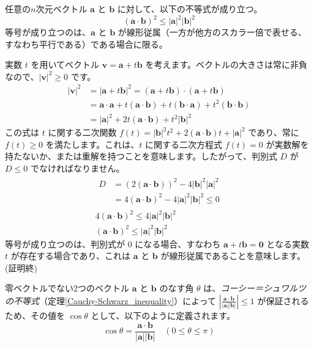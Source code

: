 \begin{thm} \label{Cauchy-Schwarz_inequality}
任意の$n$次元ベクトル $\bm{a}$ と $\bm{b}$ に対して、以下の不等式が成り立つ。
\[(\bm{a} \cdot \bm{b})^2 \le |\bm{a}|^2 |\bm{b}|^2\]
等号が成り立つのは、$\bm{a}$ と $\bm{b}$ が線形従属（一方が他方のスカラー倍で表せる、すなわち平行である）である場合に限る。
\begin{proof*}
実数 $t$ を用いてベクトル $\bm{v} = \bm{a} + t\bm{b}$ を考えます。ベクトルの大きさは常に非負なので、$|\bm{v}|^2 \ge 0$ です。
\begin{align*}
|\bm{v}|^2 &= |\bm{a} + t\bm{b}|^2 = (\bm{a} + t\bm{b}) \cdot (\bm{a} + t\bm{b})\\
&= \bm{a} \cdot \bm{a} + t(\bm{a} \cdot \bm{b}) + t(\bm{b} \cdot \bm{a}) + t^2(\bm{b} \cdot \bm{b})\\
&= |\bm{a}|^2 + 2t(\bm{a} \cdot \bm{b}) + t^2|\bm{b}|^2
\end{align*}
この式は $t$ に関する二次関数 $f(t) = |\bm{b}|^2 t^2 + 2(\bm{a} \cdot \bm{b}) t + |\bm{a}|^2$ であり、常に $f(t) \ge 0$ を満たします。これは、$t$ に関する二次方程式 $f(t) = 0$ が実数解を持たないか、または重解を持つことを意味します。したがって、判別式 $D$ が $D \le 0$ でなければなりません。
\begin{gather*}
\begin{aligned}
D &= (2(\bm{a} \cdot \bm{b}))^2 - 4|\bm{b}|^2 |\bm{a}|^2\\
&= 4(\bm{a} \cdot \bm{b})^2 - 4|\bm{a}|^2 |\bm{b}|^2 \le 0
\end{aligned}\\
4(\bm{a} \cdot \bm{b})^2 \le 4|\bm{a}|^2 |\bm{b}|^2\\
(\bm{a} \cdot \bm{b})^2 \le |\bm{a}|^2 |\bm{b}|^2
\end{gather*}
等号が成り立つのは、判別式が $0$ になる場合、すなわち $\bm{a} + t\bm{b} = \bm{0}$ となる実数 $t$ が存在する場合であり、これは $\bm{a}$ と $\bm{b}$ が線形従属であることを意味します。(証明終)
\end{proof*}
\end{thm}

\begin{dfn} \label{cosine}
零ベクトルでない2つのベクトル $\bm{a}$ と $\bm{b}$ のなす角 $\theta$ は、\emph{コーシー＝シュワルツの不等式}（定理\ref{Cauchy-Schwarz_inequality}）によって $\left| \frac{\bm{a} \cdot \bm{b}}{|\bm{a}| |\bm{b}|} \right| \le 1$ が保証されるため、その値を $\cos\theta$ として、以下のように定義されます。
\[\cos\theta = \frac{\bm{a} \cdot \bm{b}}{|\bm{a}| |\bm{b}|} \quad (0 \le \theta \le \pi)\]
\end{dfn}

